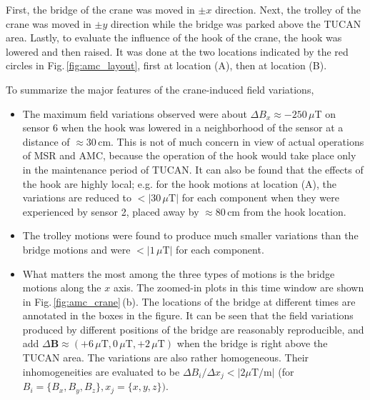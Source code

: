  First, the bridge of the crane was moved in $\pm x$ direction. Next, the trolley of the crane was moved in $\pm y$ direction while the bridge was parked above the TUCAN area. Lastly, to evaluate the influence of the hook of the crane, the hook was lowered and then raised. It was done at the two locations indicated by the red circles in Fig.\,\ref{fig:amc_layout}, first at  location (A), then at  location (B). 

To summarize the major features of the crane-induced field variations,
\begin{itemize}
\item The maximum field variations observed were about $\Delta B_{x}\approx -250\,\mu$T on sensor 6 when the hook was lowered in a neighborhood of the sensor at a distance of $\approx 30\,$cm. This is not of much concern in view of actual operations of MSR and AMC, because the operation of the hook would take place only in the maintenance period of TUCAN. It can also be found that the effects of the hook are highly local; e.g. for the hook motions at location (A), the variations are reduced to $<\left|30\,\mu\mathrm{T}\right|$ for each component when they were experienced by sensor 2, placed away by $\approx 80\,$cm from the hook location.
\item The trolley motions were found to produce much smaller variations than the bridge motions and were $<|1\,\mu\mathrm{T}|$ for each component. 
\item What matters the most among the three types of motions is the bridge motions along the $x$ axis. The zoomed-in plots in this time window are shown in Fig.\,\ref{fig:amc_crane}\,(b). The locations of the bridge at different times are annotated in the boxes in the figure. It can be seen that the field variations produced by different positions of the bridge are reasonably reproducible, and add $\Delta \mathbf{B}\approx (+6\,\mu\mathrm{T}, 0\,\mu\mathrm{T},+2\,\mu\mathrm{T})$ when the bridge is right above the TUCAN area. The variations are also rather homogeneous. Their inhomogeneities are evaluated to be $\Delta B_{i}/\Delta x_{j} < \left|2 \mu \mathrm{T}/ \mathrm{m}\right|$ (for $B_{i}= \{B_{x}, B_{y}, B_{z}\}, x_{j}=\{x,y,z\})$.
\end{itemize}

